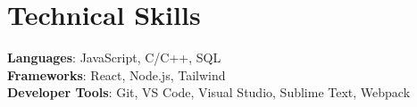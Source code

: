 
\section{Technical Skills}
 \begin{itemize}[leftmargin=0.15in, label={}]
    \small{\item{
    
     \textbf{Languages}{: JavaScript, C/C++, SQL } \\
     
     \textbf{Frameworks}{: React, Node.js, Tailwind} \\
     
     \textbf{Developer Tools}{: Git, VS Code, Visual Studio, Sublime Text, Webpack} \\
     
    }}
 \end{itemize}